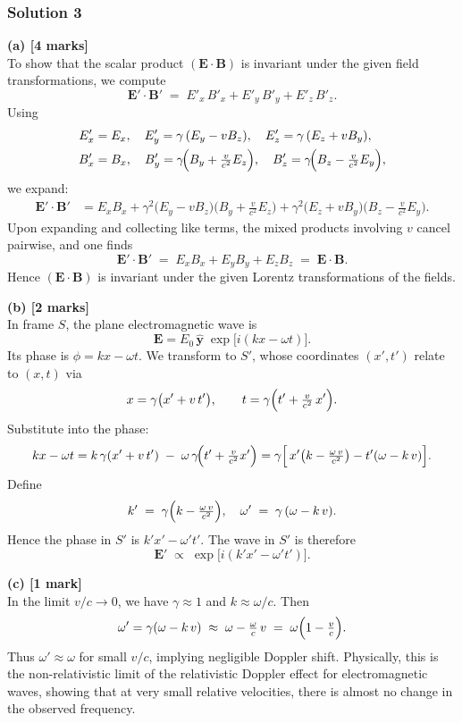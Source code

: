 \documentclass{article}
\begin{document}
\subsubsection{Solution 3}
\noindent
\textbf{(a) [4 marks]}\\
To show that the scalar product $(\mathbf{E}\cdot \mathbf{B})$ is invariant under the given field transformations, we compute
\[
\mathbf{E}' \cdot \mathbf{B}'
\;=\;
E'_x\,B'_x + E'_y\,B'_y + E'_z\,B'_z.
\]
Using
\[
\begin{aligned}
E'_x &= E_x,\quad E'_y = \gamma\,(E_y - v B_z),\quad E'_z = \gamma\,(E_z + v B_y),\\
B'_x &= B_x,\quad B'_y = \gamma\!\Bigl(B_y + \tfrac{v}{c^2}E_z\Bigr),\quad B'_z = \gamma\!\Bigl(B_z - \tfrac{v}{c^2}E_y\Bigr),
\end{aligned}
\]
we expand:
\[
\begin{aligned}
\mathbf{E}'\cdot \mathbf{B}'
&= E_x B_x 
+ \gamma^2 \bigl(E_y - vB_z\bigr)\bigl(B_y + \tfrac{v}{c^2}E_z\bigr)
+ \gamma^2 \bigl(E_z + vB_y\bigr)\bigl(B_z - \tfrac{v}{c^2}E_y\bigr).
\end{aligned}
\]
Upon expanding and collecting like terms, the mixed products involving $v$ cancel pairwise, and one finds
\[
\mathbf{E}'\cdot \mathbf{B}' \;=\; E_x B_x + E_y B_y + E_z B_z \;=\; \mathbf{E}\cdot \mathbf{B}.
\]
Hence $(\mathbf{E}\cdot \mathbf{B})$ is invariant under the given Lorentz transformations of the fields.

\bigskip

\noindent
\textbf{(b) [2 marks]}\\
In frame $S$, the plane electromagnetic wave is
\[
\mathbf{E} = E_0\,\hat{\mathbf{y}}\;\exp\bigl[i(kx - \omega t)\bigr].
\]
Its phase is $\phi = kx - \omega t$. We transform to $S'$, whose coordinates $(x',t')$ relate to $(x,t)$ via
\[
x = \gamma\bigl(x' + v\,t'\bigr), 
\qquad
t = \gamma\Bigl(t' + \tfrac{v}{c^2}\,x'\Bigr).
\]
Substitute into the phase:
\[
kx - \omega t 
= k\,\gamma(x' + v\,t') \;-\; \omega\,\gamma\!\Bigl(t' + \tfrac{v}{c^2}x'\Bigr)
= \gamma \Bigl[\,x'\bigl(k - \tfrac{\omega\,v}{c^2}\bigr) - t'(\omega - k\,v)\Bigr].
\]
Define
\[
k' \;=\; \gamma\Bigl(k - \tfrac{\omega\,v}{c^2}\Bigr),
\quad
\omega' \;=\; \gamma\,(\omega - k\,v).
\]
Hence the phase in $S'$ is $k'x' - \omega' t'$. The wave in $S'$ is therefore
\[
\mathbf{E}' \;\propto\; \exp\bigl[i(k'x' - \omega' t')\bigr].
\]

\bigskip

\noindent
\textbf{(c) [1 mark]}\\
In the limit $v/c \to 0$, we have $\gamma \approx 1$ and $k \approx \omega/c$. Then
\[
\omega' = \gamma(\omega - k\,v) 
\;\approx\; \omega - \tfrac{\omega}{c}\,v 
\;=\; \omega\Bigl(1 - \tfrac{v}{c}\Bigr).
\]
Thus $\omega' \approx \omega$ for small $v/c$, implying negligible Doppler shift. Physically, this is the non-relativistic limit of the relativistic Doppler effect for electromagnetic waves, showing that at very small relative velocities, there is almost no change in the observed frequency.
\end{document}
